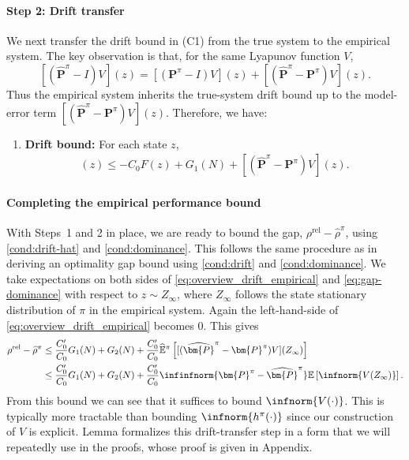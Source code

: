 \documentclass[mnsc,nonblindrev]{informs3}
\newcommand{\E}{\mathbb{E}}
\newcommand{\bp}{\bm{P}}
\newcommand{\bphat}{\widehat{\bm{P}}}
\begin{document}
\paragraph{Step 2: Drift transfer}
We next transfer the drift bound in (C1) from the true system to the
empirical system. The key observation is that, for the same Lyapunov
function \(V\),
\[
    [(\widehat{\mathbf P}^{\pi}-I)V](z)
    =
    [(\mathbf P^{\pi}-I)V](z)
    +
    [(\widehat{\mathbf P}^{\pi}-\mathbf P^{\pi})V](z).
\]
Thus the empirical system inherits the true-system drift bound up to the
model-error term \([(\widehat{\mathbf P}^{\pi}-\mathbf P^{\pi})V](z)\). Therefore, we have:
\begin{enumerate}[label=(\textbf{\^{C\arabic*}}),leftmargin=3.5em]
    \item\label{cond:drift-hat} \textbf{Drift bound:} For each state $z$,
    \begin{align}
    [(\bphat^{\pi}-I)V](z) \leq - C_0 F(z) + G_1(N) + [(\bphat^{\pi}-\bp^{\pi})V](z). \label{eq:overview_drift_empirical}
    \end{align}
\end{enumerate}


\paragraph{Completing the empirical performance bound}
With Steps~1 and 2 in place, we are ready to bound the gap, $\rho^{\mathrm{rel}} - \widehat{\rho}^{\pi}$, using \ref{cond:drift-hat} and \ref{cond:dominance}.
This follows the same procedure as in deriving an optimality gap bound using \ref{cond:drift} and \ref{cond:dominance}.
We take expectations on both sides of \eqref{eq:overview_drift_empirical} and \eqref{eq:gap-dominance} with respect to $z\sim Z_{\infty}$, where $Z_{\infty}$ follows the state stationary distribution of $\pi$ in the empirical system.
Again the left-hand-side of \eqref{eq:overview_drift_empirical} becomes $0$.
This gives
\begin{align}
    \rho^{\mathrm{rel}}-\widehat{\rho}^{\pi}
    &\le \frac{C_0'}{C_0}G_1(N)+G_2(N)+\frac{C_0'}{C_0}\widehat{\mathbb{E}}^{\pi}\left[[(\bphat^{\pi}-\bp^{\pi})V](Z_{\infty})\right]\\
    &\le \frac{C_0'}{C_0}G_1(N)+G_2(N)+\frac{C_0'}{C_0} \infinfnorm{\bp^{\pi}-\bphat^{\pi}} \E\left[\infnorm{V(Z_\infty)}\right].
    \label{eq:overview_empirical_perf_bound_2}
\end{align}
From this bound we can see that it suffices to bound $\infnorm{V(\cdot)}$.
This is typically more tractable than bounding $\infnorm{h^{\pi}(\cdot)}$ since our construction of $V$ is explicit. Lemma formalizes this drift-transfer step in a form that we will repeatedly use in the proofs, whose proof is given in Appendix. 
\end{document}
